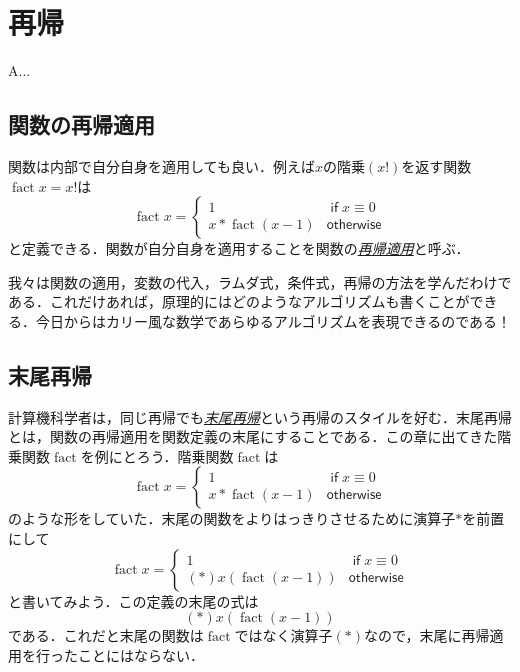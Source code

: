 \documentclass[a5paper,draft]{jsbook}
\newenvironment{leader}{\begingroup}{\endgroup}
\newcommand{\keyword}[1]{{\underline{\emph{#1}}}}
\DeclareMathOperator{\mathFactorial}{fact}
\newcommand{\mathKeyword}[1]{\operatorname{\textsf{#1}}}
\newcommand{\mathIf}{\mathKeyword{if}}
\newcommand{\mathOtherwise}{\mathKeyword{otherwise}}
\begin{document}
\chapter{再帰}

\begin{leader}
A...
\end{leader}


\section{関数の再帰適用}

関数は内部で自分自身を適用しても良い．例えば$x$の階乗$(x!)$を返す関数$\mathFactorial x=x!$は
\begin{equation}
\mathFactorial x=\begin{cases}
1&\mathIf x\equiv0\\
x*\mathFactorial(x-1)&\mathOtherwise
\end{cases}
\end{equation}
と定義できる．関数が自分自身を適用することを関数の\keyword{再帰適用}と呼ぶ．

我々は関数の適用，変数の代入，ラムダ式，条件式，再帰の方法を学んだわけである．これだけあれば，原理的にはどのようなアルゴリズムも書くことができる．今日からはカリー風な数学であらゆるアルゴリズムを表現できるのである！

\section{末尾再帰}

計算機科学者は，同じ再帰でも\keyword{末尾再帰}という再帰のスタイルを好む．末尾再帰とは，関数の再帰適用を関数定義の末尾にすることである．この章に出てきた階乗関数$\mathFactorial$を例にとろう．階乗関数$\mathFactorial$は
\begin{equation}
\mathFactorial x=\begin{cases}
1&\mathIf x\equiv0\\
x*\mathFactorial(x-1)&\mathOtherwise
\end{cases}
\end{equation}
のような形をしていた．末尾の関数をよりはっきりさせるために演算子$*$を前置にして
\begin{equation}
\mathFactorial x=\begin{cases}
1&\mathIf x\equiv0\\
(*)x(\mathFactorial(x-1))&\mathOtherwise
\end{cases}
\end{equation}
と書いてみよう．この定義の末尾の式は
\begin{equation}
(*)x(\mathFactorial(x-1))
\end{equation}
である．これだと末尾の関数は$\mathFactorial$ではなく演算子$(*)$なので，末尾に再帰適用を行ったことにはならない．
\end{document}
